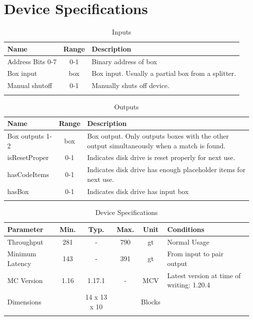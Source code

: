 \documentclass[10pt]{datasheet}
\begin{document}
\onecolumn

\section{Device Specifications}

\begin{table}[h]
    \caption{Inputs}
    \begin{tabularx}{\textwidth}{l | c | X}
        \thickhline
        \textbf{Name} & \textbf{Range} & \textbf{Description} \\
        \hline
        Address Bits 0-7 & 0-1 & Binary address of box \\
        \hline
        Box input & box & Box input. Usually a partial box from a splitter. \\
        \hline
        Manual shutoff & 0-1 & Manually shuts off device. \\
        \thickhline
\end{tabularx}
\end{table}

\begin{table}[h]
    \caption{Outputs}
    \begin{tabularx}{\textwidth}{l | c | X}
        \thickhline
        \textbf{Name} & \textbf{Range} & \textbf{Description} \\
        \hline
        Box outputs 1-2 & box & Box output. Only outputs boxes with the other output simultaneously when a match is found. \\
        \hline
        isResetProper & 0-1 & Indicates disk drive is reset properly for next use. \\
        \hline
        hasCodeItems & 0-1 & Indicates disk drive has enough placeholder items for next use. \\
        \hline
        hasBox & 0-1 & Indicates disk drive has input box \\
        \hline
        \thickhline
\end{tabularx}
\end{table}

\begin{table}[h]
    \caption{Device Specifications}
    \begin{tabularx}{\textwidth}{l | c c c | c | X}
        \thickhline
        \textbf{Parameter} & \textbf{Min.} & \textbf{Typ.} & \textbf{Max.} &
        \textbf{Unit} & \textbf{Conditions} \\
        \hline
        Throughput  & 281 & - & 790 & gt & Normal Usage \\
        \hline
        Minimum Latency & 143 & - & 391 & gt & From input to pair output \\
        \hline
        MC Version & 1.16 & 1.17.1 & - & MCV & Latest version at time of writing: 1.20.4\\
        \hline
        Dimensions & & 14 x 13 x 10 & & Blocks & \\
        \thickhline
\end{tabularx}
\end{table}
\newpage
\end{document}
